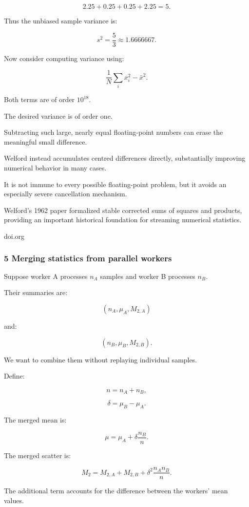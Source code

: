 \[
 2.25+0.25+0.25+2.25=5.
\]

Thus the unbiased sample variance is:

\[
 \boxed{s^2=\frac53\approx1.6666667}.
\]

Now consider computing variance using:

\[
 \frac1N\sum_ix_i^2-\bar x^2.
\]

Both terms are of order \(10^{18}\).

The desired variance is of order one.

Subtracting such large, nearly equal floating-point numbers can erase the meaningful small difference.

Welford instead accumulates centred differences directly, substantially improving numerical behavior in many cases.

It is not immune to every possible floating-point problem, but it avoids an especially severe cancellation mechanism.

Welford's 1962 paper formalized stable corrected sums of squares and products, providing an important historical foundation for streaming numerical statistics.

doi.org

\subsubsection{5 Merging statistics from parallel workers}\label{02-foundations-ii-ch030-merging-statistics-from-parallel-workers}

Suppose worker A processes \(n_A\) samples and worker B processes \(n_B\).

Their summaries are:

\[
 (n_A,\mu_A,M_{2,A})
\]

and:

\[
 (n_B,\mu_B,M_{2,B}).
\]

We want to combine them without replaying individual samples.

Define:

\[
 n=n_A+n_B,
\]

\[
 \delta=\mu_B-\mu_A.
\]

The merged mean is:

\[
 \boxed{ \mu= \mu_A+\delta\frac{n_B}{n} }.
\]

The merged scatter is:

\[
 \boxed{ M_2= M_{2,A}+M_{2,B} + \delta^2\frac{n_An_B}{n} }.
\]

The additional term accounts for the difference between the workers' mean values.

